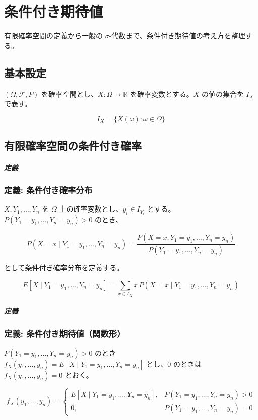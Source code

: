 \documentclass[uplatex,dvipdfmx,11pt,a4paper,openany]{bxjsbook}
\begin{document}
\chapter{条件付き期待値}
有限確率空間の定義から一般の $\sigma$-代数まで、条件付き期待値の考え方を整理する。

\section{基本設定}
$(\Omega, \mathcal{F}, P)$ を確率空間とし、$X : \Omega \to \mathbb{R}$ を確率変数とする。$X$ の値の集合を $I_X$ で表す。

\[
          I_X = \{ X(\omega) : \omega \in \Omega \}
        \]

\section{有限確率空間の条件付き確率}
\paragraph{定義}
\subsection{定義: 条件付き確率分布}
$X, Y_1, \ldots, Y_n$ を $\Omega$ 上の確率変数とし、$y_i \in I_{Y_i}$ とする。$P(Y_1=y_1, \ldots, Y_n=y_n) > 0$ のとき、

\[
            P(X=x \mid Y_1=y_1,\ldots,Y_n=y_n)
            = \frac{P(X=x, Y_1=y_1,\ldots,Y_n=y_n)}{P(Y_1=y_1,\ldots,Y_n=y_n)}  
          \]

として条件付き確率分布を定義する。

\[
            E[X \mid Y_1=y_1,\ldots,Y_n=y_n]
            = \sum_{x \in I_X} x\,P(X=x \mid Y_1=y_1,\ldots,Y_n=y_n)
          \]


\paragraph{定義}
\subsection{定義: 条件付き期待値（関数形）}
$P(Y_1=y_1,\ldots,Y_n=y_n)>0$ のとき $f_X(y_1,\ldots,y_n)=E[X \mid Y_1=y_1,\ldots,Y_n=y_n]$ とし、0 のときは $f_X(y_1,\ldots,y_n)=0$ とおく。

\[
            f_X(y_1,\ldots,y_n)=
            \begin{cases}
              E[X \mid Y_1=y_1,\ldots,Y_n=y_n], & P(Y_1=y_1,\ldots,Y_n=y_n) > 0 \\
              0, & P(Y_1=y_1,\ldots,Y_n=y_n)=0
            \end{cases}
          \]
\end{document}
